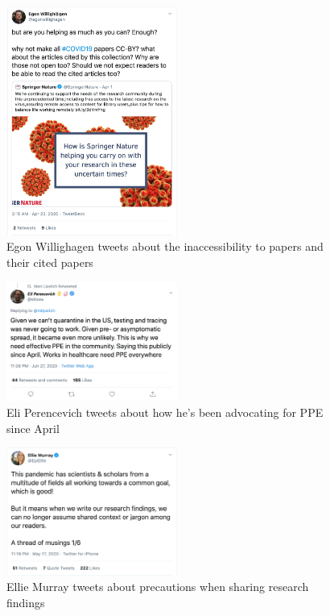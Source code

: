 \documentclass[acmsmall,authordraft]{acmart}
\begin{document}
\begin{figure}
  \includegraphics[width=0.5\textwidth]{Pictures/Appendix_Tweets/egon willighagen tweet.png}
  \caption{Egon Willighagen tweets about the inaccessibility to papers and their cited papers}
  \label{egon_willighagen_tweet}
\end{figure}

\begin{figure}
  \includegraphics[width=0.5\textwidth]{Pictures/Appendix_Tweets/eli perencevich tweet.png}
  \caption{Eli Perencevich tweets about how he's been advocating for PPE since April}
  \label{eli_perencevich_tweet}
\end{figure}

\begin{figure}
  \includegraphics[width=0.5\textwidth]{Pictures/Appendix_Tweets/ellie murray tweet.png}
  \caption{Ellie Murray tweets about precautions when sharing research findings}
  \label{ellie_murray_tweet}
\end{figure}
\end{document}
